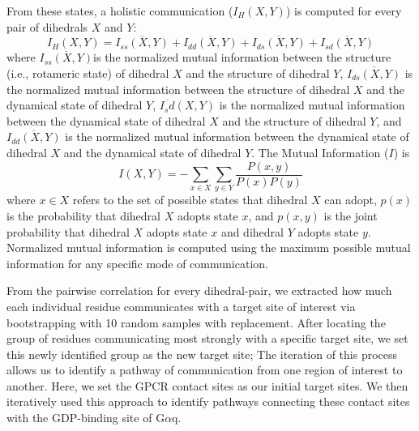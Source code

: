 \documentclass[../main.tex]{subfiles}
\begin{document}
        From these states, a holistic communication ($I_{H}(X,Y)$) is computed for every pair of dihedrals $X$ and $Y$:
        \begin{equation}\label{holistic-mut-inf-eq}
            I_{H}(X,Y) = \overline{I_{ss}(X,Y)}+\overline{I_{dd}(X,Y)}+\overline{I_{ds}(X,Y)}+\overline{I_{sd}(X,Y)}
        \end{equation}
        where $\overline{I_{ss}(X,Y)}$is the normalized mutual information between the structure (i.e., rotameric state) of dihedral $X$ and the structure of dihedral $Y$, $\overline{I_{ds}(X,Y)}$ is the normalized mutual information between the structure of dihedral $X$ and the dynamical state of dihedral $Y$, $\overline{I_sd}(X,Y)$ is the normalized mutual information between the dynamical state of dihedral $X$ and the structure of dihedral $Y$, and $\overline{I_{dd}(X,Y)}$ is the normalized mutual information between the dynamical state of dihedral $X$ and the dynamical state of dihedral $Y$. The Mutual Information ($I$) is
        \begin{equation}\label{mut-inf-eq}
            I(X,Y) = -\sum_{x \in X}\sum_{y \in Y} {{\frac{P(x,y)}{P(x)P(y)}}}
        \end{equation}
        where $x \in X$ refers to the set of possible states that dihedral $X$ can adopt, $p(x)$ is the probability that dihedral $X$ adopts state $x$, and $p(x,y)$ is the joint probability that dihedral $X$ adopts state $x$ and dihedral $Y$ adopts state $y$. Normalized mutual information is computed using the maximum possible mutual information for any specific mode of communication.
        
        From the pairwise correlation for every dihedral-pair, we extracted how much each individual residue communicates with a target site of interest via bootstrapping with 10 random samples with replacement. After locating the group of residues communicating most strongly with a specific target site, we set this newly identified group as the new target site; The iteration of this process allows us to identify a pathway of communication from one region of interest to another. Here, we set the GPCR contact sites as our initial target sites. We then iteratively used this approach to identify pathways connecting these contact sites with the GDP-binding site of G$\alpha$q.
\end{document}
